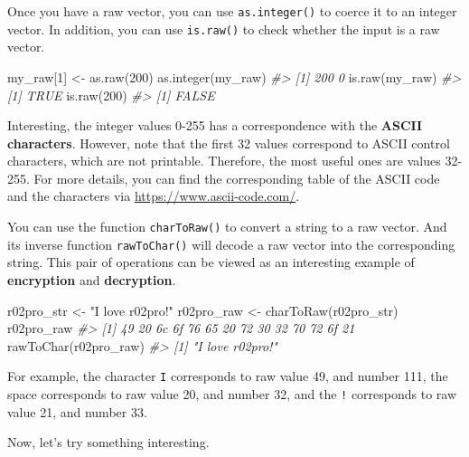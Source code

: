 \documentclass[
]{book}
\newenvironment{Shaded}{\begin{snugshade}}{\end{snugshade}}
\newcommand{\CommentTok}[1]{\textcolor[rgb]{0.56,0.35,0.01}{\textit{#1}}}
\newcommand{\DecValTok}[1]{\textcolor[rgb]{0.00,0.00,0.81}{#1}}
\newcommand{\FunctionTok}[1]{\textcolor[rgb]{0.00,0.00,0.00}{#1}}
\newcommand{\NormalTok}[1]{#1}
\newcommand{\OtherTok}[1]{\textcolor[rgb]{0.56,0.35,0.01}{#1}}
\newcommand{\StringTok}[1]{\textcolor[rgb]{0.31,0.60,0.02}{#1}}
\begin{document}
Once you have a raw vector, you can use \texttt{as.integer()} to coerce it to an integer vector. In addition, you can use \texttt{is.raw()} to check whether the input is a raw vector.

\begin{Shaded}
\begin{Highlighting}[]
\NormalTok{my\_raw[}\DecValTok{1}\NormalTok{] }\OtherTok{\textless{}{-}} \FunctionTok{as.raw}\NormalTok{(}\DecValTok{200}\NormalTok{)}
\FunctionTok{as.integer}\NormalTok{(my\_raw)}
\CommentTok{\#\textgreater{} [1] 200   0}
\FunctionTok{is.raw}\NormalTok{(my\_raw)}
\CommentTok{\#\textgreater{} [1] TRUE}
\FunctionTok{is.raw}\NormalTok{(}\DecValTok{200}\NormalTok{)}
\CommentTok{\#\textgreater{} [1] FALSE}
\end{Highlighting}
\end{Shaded}

Interesting, the integer values 0-255 has a correspondence with the \textbf{ASCII characters}. However, note that the first 32 values correspond to ASCII control characters, which are not printable. Therefore, the most useful ones are values 32-255. For more details, you can find the corresponding table of the ASCII code and the characters via \url{https://www.ascii-code.com/}.

You can use the function \texttt{charToRaw()} to convert a string to a raw vector. And its inverse function \texttt{rawToChar()} will decode a raw vector into the corresponding string. This pair of operations can be viewed as an interesting example of \textbf{encryption} and \textbf{decryption}.

\begin{Shaded}
\begin{Highlighting}[]
\NormalTok{r02pro\_str }\OtherTok{\textless{}{-}} \StringTok{"I love r02pro!"}
\NormalTok{r02pro\_raw }\OtherTok{\textless{}{-}} \FunctionTok{charToRaw}\NormalTok{(r02pro\_str)}
\NormalTok{r02pro\_raw}
\CommentTok{\#\textgreater{}  [1] 49 20 6c 6f 76 65 20 72 30 32 70 72 6f 21}
\FunctionTok{rawToChar}\NormalTok{(r02pro\_raw)}
\CommentTok{\#\textgreater{} [1] "I love r02pro!"}
\end{Highlighting}
\end{Shaded}

For example, the character \texttt{I} corresponds to raw value 49, and number 111, the space corresponds to raw value 20, and number 32, and the \texttt{!} corresponds to raw value 21, and number 33.

Now, let's try something interesting.
\end{document}

